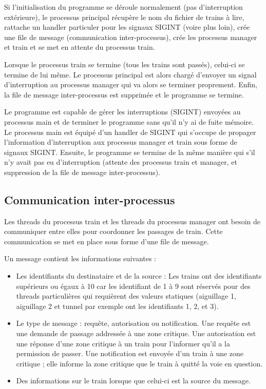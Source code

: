 \documentclass[a4paper,12pt]{article}
\begin{document}
Si l'initialisation du programme se déroule normalement (pas d'interruption extérieure), le processus principal récupère le nom du fichier de trains à lire, rattache un handler particuler pour les signaux SIGINT (voire plus loin), crée une file de message (communication inter-processus), crée les processus manager et train et se met en attente du processus train.

Lorsque le processus train se termine (tous les trains sont passés), celui-ci se termine de lui même. Le processus principal est alors chargé d'envoyer un signal d'interruption au processus manager qui va alors se terminer proprement. Enfin, la file de message inter-processus est supprimée et le programme se termine.

Le programme est capable de gérer les interruptions (SIGINT) envoyées au processus main et de terminer le programme sans qu'il n'y ai de fuite mémoire. Le processus main est équipé d'un handler de SIGINT qui s'occupe de propager l'information d'interruption aux processus manager et train sous forme de signaux SIGINT. Ensuite, le programme se termine de la même manière qui s'il n'y avait pas eu d'interruption (attente des processus train et manager, et suppression de la file de message inter-processus).

\subsection{Communication inter-processus}

Les threads du processus train et les threads du processus manager ont besoin de communiquer entre elles pour coordonner les passages de train. Cette communication se met en place sous forme d'une file de message.

Un message contient les informations suivantes :
\begin{itemize}
	\item Les identifiants du destinataire et de la source : Les trains ont des identifiants supérieurs ou égaux à 10 car les identifiant de 1 à 9 sont réservés pour des threads particulières qui requièrent des valeurs statiques (aiguillage 1, aiguillage 2 et tunnel par exemple ont les identifiants 1, 2, et 3).
	\item Le type de message : requête, autorisation ou notification. Une requête est une demande de passage addressée à une zone critique. Une autorisation est une réponse d'une zone critique à un train pour l'informer qu'il a la permission de passer. Une notification est envoyée d'un train à une zone critique ; elle informe la zone critique que le train à quitté la voie en question.
	\item Des informations sur le train lorsque que celui-ci est la source du message.
\end{itemize}
\end{document}
